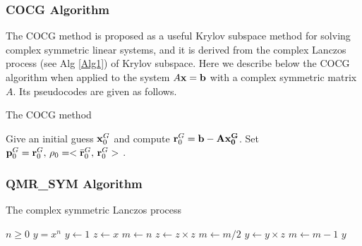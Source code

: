 \documentclass{article}
\begin{document}
\subsubsection{COCG Algorithm}
The COCG method is proposed as a useful Krylov subspace method for solving complex symmetric linear systems, and it is derived from the complex Lanczos process (see Alg \ref{Alg1}) of Krylov subspace. Here we describe below the COCG algorithm when applied to the system $A \bf{x} = \bf{b}$ with a complex symmetric matrix $A$. Its pseudocodes are given as follows.
\begin{algorithm}
\caption{The COCG method}
\begin{algorithmic}[1]
\label{Alg2}
\Require Give an initial guess ${\bf{x}}^G_0$ and compute ${\bf{r}}^G_0 = \bf{b}-A {\bf{x}}^{G}_0$. 
\State Set ${\bf{p}}^G_0 = {\bf{r}}^G_0, \, \rho_0 = <\bar{{\bf{r}}}^G_0 ,\, {\bf{r}}^G_0 >$ .
\EndFor
\end{algorithmic}
\end{algorithm}

\subsubsection{QMR\_SYM Algorithm}

\begin{algorithm}
\caption{The complex symmetric Lanczos process}
\begin{algorithmic}[3]
\Require $n \geq 0$ 
\Ensure $y = x^n$ 
    \State $y \gets 1$
    \State $z \gets x$
    \State $m \gets n$
            \State $z \gets z \times z$
            \State $m \gets m / 2$
        \Else
            \State $y \gets y \times z$
            \State $m \gets m - 1$
        \EndIf
    \EndWhile
    \State \Return $y$
\EndFunction
\end{algorithmic}
\end{algorithm}
\end{document}
